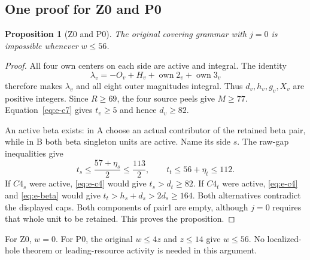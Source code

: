 \documentclass[11pt,letterpaper]{article}
\newcommand{\own}{\operatorname{own}}
\newtheorem{proposition}[theorem]{Proposition}
\theoremstyle{definition}\newtheorem{definition}[theorem]{Definition}
\begin{document}
\subsection{One proof for Z0 and P0}\label{sec:z0p0}
\begin{proposition}[Z0 and P0]\label{prop:z0p0}
The original covering grammar with $j=0$ is impossible whenever $w\le56$.
\end{proposition}
\begin{proof}
All four own centers on each side are active and integral. The identity
\[
\lambda_v=-O_v+H_v+\own2_v+\own3_v
\]
therefore makes $\lambda_v$ and all eight outer magnitudes integral. Thus $d_v,h_v,g_v,X_v$ are positive integers. Since $R\ge69$, the four source peels give $M\ge77$. Equation~\eqref{eq:e-c7} gives $t_v\ge5$ and hence $d_v\ge82$.

An active beta exists: in A choose an actual contributor of the retained beta pair, while in B both beta singleton units are active. Name its side $s$. The raw-gap inequalities give
\[
t_s\le\frac{57+\eta_s}{2}\le\frac{113}{2},\qquad
 t_t\le56+\eta_t\le112.
\]
If $C4_s$ were active, \eqref{eq:e-c4} would give $t_s>d_t\ge82$. If $C4_t$ were active, \eqref{eq:e-c4} and \eqref{eq:e-beta} would give $t_t>h_s+d_s>2d_s\ge164$. Both alternatives contradict the displayed caps. Both components of pair1 are empty, although $j=0$ requires that whole unit to be retained. This proves the proposition.
\end{proof}
For Z0, $w=0$. For P0, the original $w\le4z$ and $z\le14$ give $w\le56$. No localized-hole theorem or leading-resource activity is needed in this argument.
\end{document}
